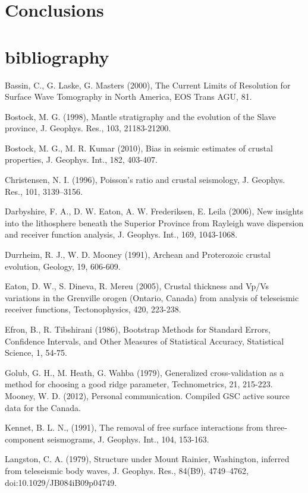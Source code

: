 \documentclass[draft, 12pt]{article}
\begin{document}
\section{Conclusions}



\section{bibliography}

Bassin, C., G. Laske, G. Masters (2000), The Current Limits of Resolution for Surface Wave Tomography in North America, EOS Trans AGU, 81.

Bostock, M. G. (1998), Mantle stratigraphy and the evolution of the Slave province, J. Geophys. Res., 103, 21183-21200.

Bostock, M. G., M. R. Kumar (2010), Bias in seismic estimates of crustal properties, J. Geophys. Int., 182, 403-407.

Christensen, N. I. (1996), Poisson's ratio and crustal seismology, J. Geophys. Res., 101, 3139–3156.

Darbyshire, F. A., D. W. Eaton, A. W. Frederiksen, E. Leila (2006), New insights into the lithosphere beneath the Superior Province from Rayleigh wave dispersion and receiver function analysis, J. Geophys. Int., 169, 1043-1068.

Durrheim, R. J., W. D. Mooney (1991), Archean and Proterozoic crustal evolution, Geology, 19, 606-609.

Eaton, D. W., S. Dineva, R. Mereu (2005), Crustal thickness and Vp/Vs variations in the Grenville orogen (Ontario, Canada) from analysis of teleseismic receiver functions, Tectonophysics, 420, 223-238.

Efron, B., R. Tibshirani (1986), Bootstrap Methods for Standard Errors, Confidence Intervals, and Other Measures of Statistical Accuracy, Statistical Science, 1, 54-75.

Golub, G. H., M. Heath, G. Wahba (1979), Generalized cross-validation as a method for choosing a good ridge parameter, Technometrics, 21, 215-223.
Mooney, W. D. (2012), Personal communication. Compiled GSC active source data for the Canada.

Kennet, B. L. N., (1991), The removal of free surface interactions from three-component seismograms, J. Geophys. Int., 104, 153-163.

Langston, C. A. (1979), Structure under Mount Rainier, Washington, inferred from teleseismic body waves, J. Geophys. Res., 84(B9), 4749–4762, doi:10.1029/JB084iB09p04749.
\end{document}
